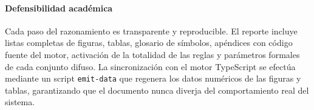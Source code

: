 \paragraph{Defensibilidad académica}
Cada paso del razonamiento es transparente y reproducible. El reporte incluye listas completas de figuras, tablas, glosario de símbolos, apéndices con código fuente del motor, activación de la totalidad de las reglas y parámetros formales de cada conjunto difuso. La sincronización con el motor TypeScript se efectúa mediante un script \texttt{emit-data} que regenera los datos numéricos de las figuras y tablas, garantizando que el documento nunca diverja del comportamiento real del sistema.
\newpage
